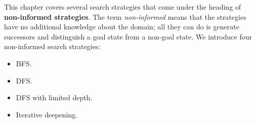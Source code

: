 This chapter covers several search strategies that come under the heading of \textbf{non-informed strategies}. The term \textit{non-informed} means that the strategies have no 
additional knowledge about the domain; all they can do is generate successors and distinguish a goal state from a non-goal state. We introduce four non-informed search strategies:
\begin{itemize}
    \renewcommand{\labelitemi}{-}
    \item BFS.
    \item DFS.
    \item DFS with limited depth.
    \item Iterative deepening.
\end{itemize}